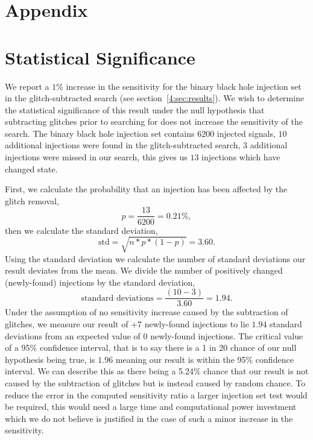 \section*{Appendix}
\section{\label{4:sec:apdx_stat_sig}Statistical Significance}

We report a $1\%$ increase in the sensitivity for the binary black hole injection set in the glitch-subtracted \gw{} search (see section~\ref{4:sec:results}). We wish to determine the statistical significance of this result under the null hypothesis that subtracting \scl{} glitches prior to searching for \gws{} does not increase the sensitivity of the \gw{} search. The binary black hole injection set contains $6200$ injected signals, $10$ additional injections were found in the glitch-subtracted \gw{} search, $3$ additional injections were missed in our search, this gives us $13$ injections which have changed state.

First, we calculate the probability that an injection has been affected by the glitch removal, 
%
\begin{equation}
    p = \frac{13}{6200} = 0.21\% ,
\end{equation}
%
then we calculate the standard deviation, 
%
\begin{equation}
    \textrm{std} = \sqrt{n * p * (1 - p)} = 3.60 .
\end{equation}
%
Using the standard deviation we calculate the number of standard deviations our result deviates from the mean. We divide the number of positively changed (newly-found) injections by the standard deviation, 
%
\begin{equation}
    \textrm{standard deviations} = \frac{(10 - 3)}{3.60} = 1.94 .
\end{equation}
%
Under the assumption of no sensitivity increase caused by the subtraction of glitches, we measure our result of +7 newly-found \gw{} injections to lie $1.94$ standard deviations from an expected value of $0$ newly-found injections. The critical value of a 95\% confidence interval, that is to say there is a 1 in 20 chance of our null hypothesis being true, is $1.96$ meaning our result is within the 95\% confidence interval. We can describe this as there being a 5.24\% chance that our result is not caused by the subtraction of glitches but is instead caused by random chance. To reduce the error in the computed sensitivity ratio a larger injection set test would be required, this would need a large time and computational power investment which we do not believe is justified in the case of such a minor increase in the sensitivity.

